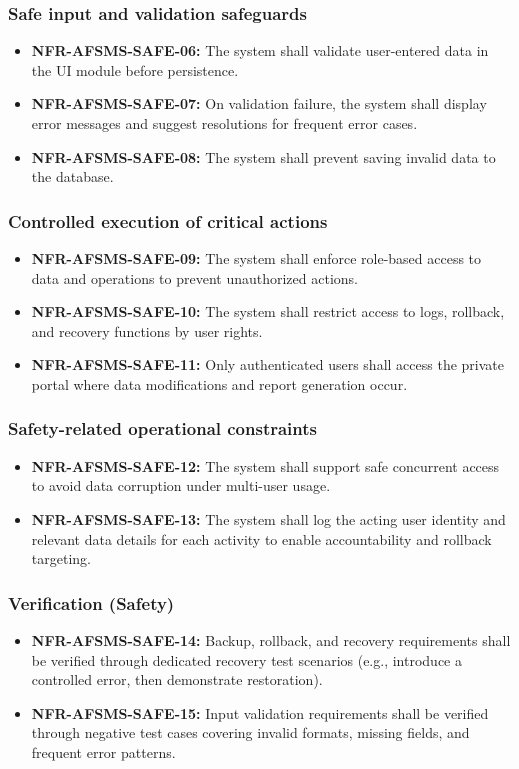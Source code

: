 \documentclass[11pt, a4paper]{article}
\begin{document}
\subsubsection{Safe input and validation safeguards}
\begin{itemize}
    \item \textbf{NFR-AFSMS-SAFE-06:} The system shall validate user-entered data in the UI module before persistence.
    \item \textbf{NFR-AFSMS-SAFE-07:} On validation failure, the system shall display error messages and suggest resolutions for frequent error cases.
    \item \textbf{NFR-AFSMS-SAFE-08:} The system shall prevent saving invalid data to the database.
\end{itemize}

\subsubsection{Controlled execution of critical actions}
\begin{itemize}
    \item \textbf{NFR-AFSMS-SAFE-09:} The system shall enforce role-based access to data and operations to prevent unauthorized actions.
    \item \textbf{NFR-AFSMS-SAFE-10:} The system shall restrict access to logs, rollback, and recovery functions by user rights.
    \item \textbf{NFR-AFSMS-SAFE-11:} Only authenticated users shall access the private portal where data modifications and report generation occur.
\end{itemize}

\subsubsection{Safety-related operational constraints}
\begin{itemize}
    \item \textbf{NFR-AFSMS-SAFE-12:} The system shall support safe concurrent access to avoid data corruption under multi-user usage.
    \item \textbf{NFR-AFSMS-SAFE-13:} The system shall log the acting user identity and relevant data details for each activity to enable accountability and rollback targeting.
\end{itemize}

\subsubsection{Verification (Safety)}
\begin{itemize}
    \item \textbf{NFR-AFSMS-SAFE-14:} Backup, rollback, and recovery requirements shall be verified through dedicated recovery test scenarios (e.g., introduce a controlled error, then demonstrate restoration).
    \item \textbf{NFR-AFSMS-SAFE-15:} Input validation requirements shall be verified through negative test cases covering invalid formats, missing fields, and frequent error patterns.
\end{itemize}
\end{document}
